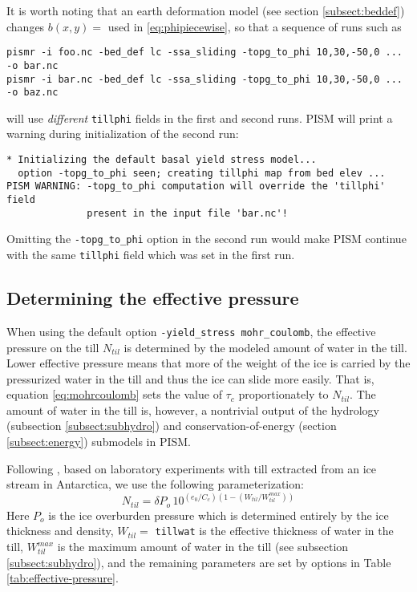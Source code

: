 It is worth noting that an earth deformation model (see section \ref{subsect:beddef}) changes $b(x,y)=$ used in \eqref{eq:phipiecewise}, so that a sequence of runs such as
\begin{verbatim}
pismr -i foo.nc -bed_def lc -ssa_sliding -topg_to_phi 10,30,-50,0 ... -o bar.nc
pismr -i bar.nc -bed_def lc -ssa_sliding -topg_to_phi 10,30,-50,0 ... -o baz.nc
\end{verbatim}
will use \emph{different} \texttt{tillphi} fields in the first and second runs.  PISM will print a warning during initialization of the second run:
\begin{verbatim}
* Initializing the default basal yield stress model...
  option -topg_to_phi seen; creating tillphi map from bed elev ...
PISM WARNING: -topg_to_phi computation will override the 'tillphi' field
              present in the input file 'bar.nc'!
\end{verbatim}
Omitting the \texttt{-topg_to_phi} option in the second run would make PISM continue with the same \texttt{tillphi} field which was set in the first run.

\subsection*{Determining the effective pressure}  When using the default option \texttt{-yield_stress mohr_coulomb}, the effective pressure on the till $N_{til}$ is determined by the modeled amount of water in the till.  Lower effective pressure means that more of the weight of the ice is carried by the pressurized water in the till and thus the ice can slide more easily.  That is, equation \eqref{eq:mohrcoulomb} sets the value of $\tau_c$ proportionately to $N_{til}$.  The amount of water in the till is, however, a nontrivial output of the hydrology (subsection \ref{subsect:subhydro}) and conservation-of-energy (section \ref{subsect:energy}) submodels in PISM.

Following \cite{Tulaczyketal2000}, based on laboratory experiments with till extracted from an ice stream in Antarctica, we use the following parameterization:
\begin{equation}
N_{til} = \delta P_o \, 10^{(e_0/C_c) \left(1 - (W_{til}/W_{til}^{max})\right)}  \label{eq:computeNtil}
\end{equation}
Here $P_o$ is the ice overburden pressure which is determined entirely by the ice thickness and density, $W_{til}=$ \texttt{tillwat} is the effective thickness of water in the till, $W_{til}^{max}$ is the maximum amount of water in the till (see subsection \ref{subsect:subhydro}), and the remaining parameters are set by options in Table \ref{tab:effective-pressure}.

